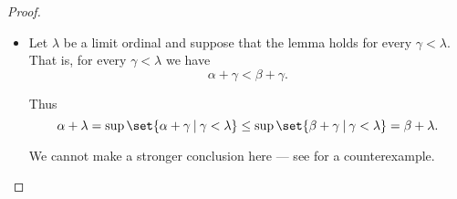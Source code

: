 \begin{proof}
\begin{itemize}
    \item Let \( \lambda \) be a limit ordinal and suppose that the lemma holds for every \( \gamma < \lambda \). That is, for every \( \gamma < \lambda \) we have
    \begin{equation*}
      \alpha + \gamma < \beta + \gamma.
    \end{equation*}

    Thus
    \begin{equation*}
      \alpha + \lambda
      =
      \sup\set{ \alpha + \gamma \given \gamma < \lambda }
      \leq
      \sup\set{ \beta + \gamma \given \gamma < \lambda }
      =
      \beta + \lambda.
    \end{equation*}

    We cannot make a stronger conclusion here --- see  for a counterexample.
  \end{itemize}
\end{proof}

